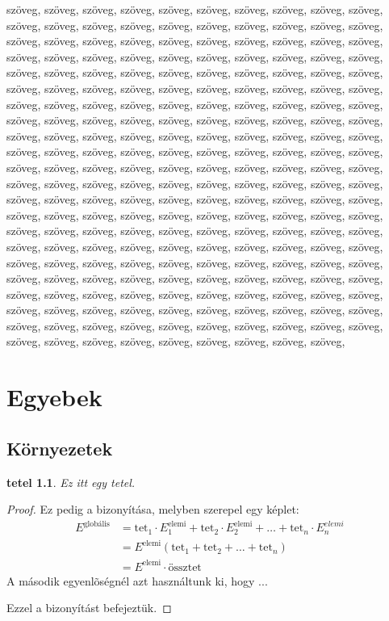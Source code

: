 \documentclass[12pt]{report}
\newtheorem{tet}{tetel}[chapter]
\theoremstyle{definition}
\begin{document}
szöveg, szöveg, szöveg,  szöveg, szöveg, szöveg, szöveg, szöveg, szöveg, szöveg, szöveg, szöveg, szöveg, szöveg, szöveg,
szöveg, szöveg, szöveg, szöveg, szöveg, szöveg, szöveg, szöveg, szöveg, szöveg, szöveg, szöveg, szöveg, szöveg, szöveg,
szöveg, szöveg, szöveg, szöveg, szöveg, szöveg, szöveg, szöveg, szöveg, szöveg, szöveg, szöveg,
szöveg, szöveg, szöveg, szöveg, szöveg, szöveg, szöveg, szöveg, szöveg, szöveg, szöveg, szöveg, szöveg, szöveg, szöveg,
szöveg, szöveg, szöveg, szöveg, szöveg, szöveg, szöveg, szöveg, szöveg, szöveg, szöveg, szöveg, szöveg, szöveg, szöveg,
szöveg, szöveg, szöveg, szöveg, szöveg, szöveg, szöveg, szöveg, szöveg, szöveg, szöveg, szöveg, szöveg, szöveg, szöveg,
szöveg, szöveg, szöveg, szöveg, szöveg, szöveg, szöveg, szöveg, szöveg, szöveg, szöveg, szöveg, szöveg, szöveg, szöveg,
szöveg, szöveg, szöveg, szöveg, szöveg, szöveg, szöveg, szöveg, szöveg, szöveg, szöveg, szöveg, szöveg, szöveg, szöveg,
szöveg, szöveg, szöveg, szöveg, szöveg, szöveg, szöveg, szöveg, szöveg, szöveg, szöveg, szöveg, szöveg, szöveg, szöveg,
szöveg, szöveg, szöveg, szöveg, szöveg, szöveg, szöveg, szöveg, szöveg, szöveg, szöveg, szöveg, szöveg, szöveg, szöveg,
szöveg, szöveg, szöveg,  szöveg, szöveg, szöveg, szöveg, szöveg, szöveg, szöveg, szöveg, szöveg, szöveg, szöveg, szöveg,
szöveg, szöveg, szöveg, szöveg, szöveg, szöveg, szöveg, szöveg, szöveg, szöveg, szöveg, szöveg, szöveg, szöveg, szöveg,
szöveg, szöveg, szöveg, szöveg, szöveg, szöveg, szöveg, szöveg, szöveg, szöveg, szöveg, szöveg,
szöveg, szöveg, szöveg, szöveg, szöveg, szöveg, szöveg, szöveg, szöveg, szöveg, szöveg, szöveg, szöveg, szöveg, szöveg,
szöveg, szöveg, szöveg, szöveg, szöveg, szöveg, szöveg, szöveg, szöveg, szöveg, szöveg, szöveg, szöveg, szöveg, szöveg,

\chapter{Egyebek}

\section{Környezetek}
\begin{tet}
\label{tet-alap}
Ez itt egy tetel.
\end{tet}

\begin{proof}
Ez pedig a bizonyítása, melyben szerepel egy képlet:
\begin{equation}
\begin{split}
E^{\text{globális}} &= \text{tet}_1\cdot E_1^{\text{elemi}}+\text{tet}_2\cdot
E_2^{\text{elemi}}+\ldots+\text{tet}_n\cdot E_n^{elemi} \\
&=E^{\text{elemi}}\left(\text{tet}_1+\text{tet}_2+\ldots+\text{tet}_n\right)\\
&=E^{\text{elemi}}\cdot\text{össztet}
\end{split}
\end{equation}
A második egyenlõségnél azt használtunk ki, hogy ...

Ezzel a bizonyítást befejeztük.
\end{proof}
\end{document}
